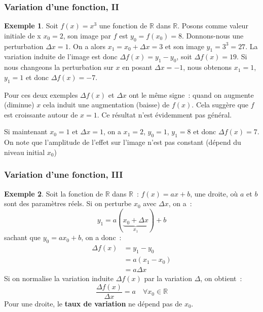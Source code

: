 \documentclass[10pt,notheorems]{beamer}
\theoremstyle{plain}
\theoremstyle{definition} %
\newtheorem{example}{Exemple}
\begin{document}
\begin{frame}
  \frametitle{Variation d'une fonction, II}
  \hypertarget{slide_variation_2}{}


  \begin{example}
    Soit $f(x) = x^3$ une fonction de $\mathbb R$ dans $\mathbb R$. Posons comme valeur initiale de x $x_0 = 2$, son image par $f$ est $y_0 = f(x_0) = 8$. Donnons-nous une perturbation $\Delta x = 1$. On a alors $x_1=x_0+\Delta x = 3$ et son image $y_1 = 3^3 = 27$. La variation induite de l'image est donc $\Delta f(x) = y_1-y_0$, soit $\Delta f(x) = 19$. Si nous changeons la perturbation sur $x$ en posant $\Delta x = -1$, nous obtenons $x_1 = 1$, $y_1 = 1$ et donc $\Delta f(x) = -7$.\newline

    Pour ces deux exemples $\Delta f(x)$ et $\Delta x$ ont le même signe~: quand on augmente (diminue) $x$ cela induit une augmentation (baisse) de $f(x)$. Cela suggère que $f$ est croissante autour de $x=1$. Ce résultat n'est évidemment pas général.\newline

    Si maintenant $x_0 = 1$ et $\Delta x = 1$, on a $x_1 = 2$, $y_0 = 1$, $y_1 = 8$ et donc $\Delta f(x) = 7$.    On note que l'amplitude de l'effet sur l'image n'est pas constant (dépend du niveau initial $x_0$)\newline

  \end{example}

\end{frame}


\begin{frame}
  \frametitle{Variation d'une fonction, III}
  \hypertarget{slide_variation_3}{}

  \begin{example}

    Soit la fonction de $\mathbb R$ dans $\mathbb R$~: $f(x) = ax+b$, une droite, où $a$ et $b$ sont des paramètres réels. Si on perturbe $x_0$ avec $\Delta x$, on a~:
    \[
      y_1 = a (\underbrace{x_0+\Delta x}_{x_1}) + b
    \]
    sachant que $y_0 = a x_0 + b$, on a donc~:
    \[
      \begin{split}
        \Delta f(x) &= y_1-y_0\\
        &= a(x_1-x_0)\\
        &= a \Delta x
      \end{split}
    \]
    Si on normalise la variation induite $\Delta f(x)$ par la variation $\Delta$, on obtient~:
    \[
      \frac{\Delta f(x)}{\Delta x} = a \quad \forall x_0\in\mathbb R
    \]
    Pour une droite, le \textbf{taux de variation} ne dépend pas de $x_0$.

  \end{example}

\end{frame}
\end{document}
